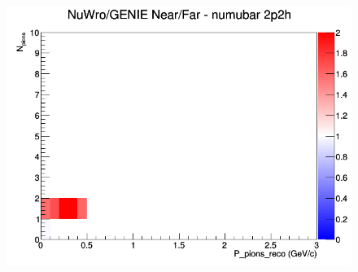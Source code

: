 \documentclass[12pt]{article}
\begin{document}
\begin{figure}[h]
\endminipage
{}
\includegraphics[width=\linewidth]{eff_N_P/GAr/pions/ratios/2p2h_NuWro_GENIE_numubar_NF_N_P.png}
\endminipage
\newline
\end{figure}
\clearpage
\end{document}
